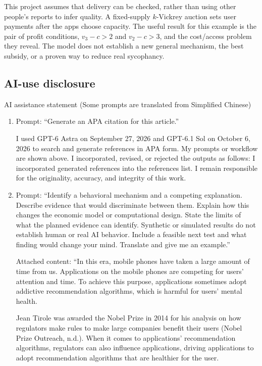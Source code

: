 This project assumes that delivery can be checked, rather than using other people's reports to infer quality. A fixed-supply $k$-Vickrey auction \cite{vickrey1961,roughgarden2014} sets user payments after the apps choose capacity. The useful result for this example is the pair of profit conditions, $v_3-c>2$ and $v_2-c>3$, and the cost/access problem they reveal. The model does not establish a new general mechanism, the best subsidy, or a proven way to reduce real sycophancy.

\subsection{AI-use disclosure}
AI assistance statement (Some prompts are translated from Simplified Chinese)\par
\begin{enumerate}[label=\arabic*.,leftmargin=*,itemsep=2pt]
\item
Prompt: ``Generate an APA citation for this article.''

I used GPT-6 Astra on September 27, 2026 and GPT-6.1 Sol on October 6, 2026 to search and generate references in APA form. My prompts or workflow are shown above. I incorporated, revised, or rejected the outputs as follows: I incorporated generated references into the references list. I remain responsible for the originality, accuracy, and integrity of this work.

\item
Prompt: ``Identify a behavioral mechanism and a competing explanation. Describe evidence that would discriminate between them. Explain how this changes the economic model or computational design. State the limits of what the planned evidence can identify. Synthetic or simulated results do not establish human or real AI behavior. Include a feasible next test and what finding would change your mind. Translate and give me an example.''

Attached content: ``In this era, mobile phones have taken a large amount of time from us. Applications on the mobile phones are competing for users' attention and time. To achieve this purpose, applications sometimes adopt addictive recommendation algorithms, which is harmful for users' mental health.

Jean Tirole was awarded the Nobel Prize in 2014 for his analysis on how regulators make rules to make large companies benefit their users (Nobel Prize Outreach, n.d.). When it comes to applications' recommendation algorithms, regulators can also influence applications, driving applications to adopt recommendation algorithms that are healthier for the user.


\end{enumerate}

